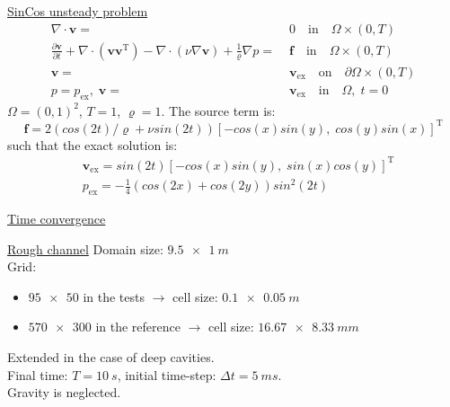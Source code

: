 \documentclass{beamer}
\begin{document}
\begin{frame}[label=timeconvSupp]{\hyperlink{timeconv}{SinCos unsteady problem}}
\begin{align*}
\nabla \cdot \mathbf{v} =& \; 0 \quad \text{in} \quad \Omega \times (0,T)\\
\frac{\partial \mathbf{v}}{\partial t} + \nabla \cdot ( \mathbf{v} 
\mathbf{v^\mathrm{T}}) - \nabla \cdot (\nu \nabla \mathbf{v}) + 
\frac{1}{\varrho} \nabla p =& \; \mathbf{f} \quad \text{in} \quad \Omega 
\times (0,T)\\
\mathbf{v} =& \; \mathbf{v}_\text{ex} \quad \text{on} \quad \partial \Omega 
\times (0,T)
\\p=p_\text{ex},\;\mathbf{v} =&\; \mathbf{v}_\text{ex} \quad \text{in} \quad 
\Omega, \; t=0
\end{align*}
$\Omega = (0,1)^2$, $T=1$, $\varrho = 1$. The source term is:
\begin{equation*}
\mathbf{f} = 2(cos(2t)/\varrho +\nu sin(2t))[-cos(x) sin(y), \; cos(y) 
sin(x)]^\mathrm{T}
\end{equation*}
such that the exact solution is:
\begin{align*}
&\mathbf{v}_\text{ex} = sin(2t)[-cos(x) sin(y), \; sin(x) cos(y)]^\mathrm{T}\\
&p_\text{ex} = -\frac{1}{4} (cos(2x)+cos(2y))sin^2(2t)
\end{align*}
\end{frame}
\begin{frame}{\hyperlink{timeconv}{Time convergence}}
\vspace{-0.8cm}
	\begin{figure}
		\centering
		\subfloat[Pressure]{\hspace{-1cm}}
		\subfloat[Velocity]{}
	\end{figure}
\end{frame}
\begin{frame}[label=roughSupp]{\hyperlink{rough}{Rough channel}}
Domain size: $\SI{9.5x1}{m}$\\[\baselineskip]
Grid:
\begin{itemize}
	\item $\num{95x50}$ in the tests $\rightarrow$ cell size: 
	$\SI{0.1x0.05}{m}$
	\item $\num{570x300}$ in the reference $\rightarrow$ cell size: 
	$\SI{16.67x8.33}{mm}$
\end{itemize}
Extended in the case of deep cavities.\\[\baselineskip]
Final time: $T=\SI{10}{s}$, initial time-step: $\Delta 
t=\SI{5}{ms}$.\\[\baselineskip]
Gravity is neglected.
\end{frame}
\end{document}
